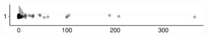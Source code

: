 \documentclass[
]{article}
\begin{document}
\begin{minipage}[t]{0.3\linewidth}

~

\end{minipage}%
\begin{minipage}[t]{0.7\linewidth}

\includegraphics[width=396px]{codebook_template_files/figure-latex/q7_27_rainplot-1}

\end{minipage}
 \vspace*{-5mm} 

\begin{minipage}[t]{0.3\linewidth}

~

\end{minipage}%
\begin{minipage}[t]{0.7\linewidth}

~

\end{minipage}
 \vspace*{-7mm} 
\end{document}
